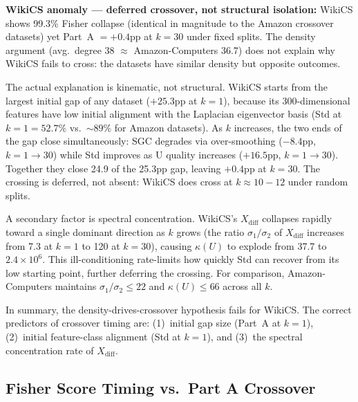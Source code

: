 \documentclass[11pt]{article}
\begin{document}
\noindent\textbf{WikiCS anomaly --- deferred crossover, not structural isolation:}
WikiCS shows 99.3\% Fisher collapse (identical in magnitude to the Amazon crossover
datasets) yet Part~A $= +0.4$pp at $k{=}30$ under fixed splits.
The density argument (avg.\ degree 38 $\approx$ Amazon-Computers 36.7) does not
explain why WikiCS fails to cross: the datasets have similar density but opposite outcomes.

The actual explanation is kinematic, not structural.
WikiCS starts from the largest initial gap of any dataset ($+25.3$pp at $k{=}1$),
because its 300-dimensional features have low initial alignment with the Laplacian
eigenvector basis (Std at $k{=}1 = 52.7\%$ vs.\ ${\sim}89\%$ for Amazon datasets).
As $k$ increases, the two ends of the gap close simultaneously: SGC degrades via
over-smoothing ($-8.4$pp, $k{=}1{\to}30$) while Std improves as U quality increases
($+16.5$pp, $k{=}1{\to}30$).  Together they close 24.9 of the 25.3pp gap, leaving
$+0.4$pp at $k{=}30$.  The crossing is deferred, not absent: WikiCS does cross at
$k{\approx}10{-}12$ under random splits.

A secondary factor is spectral concentration.  WikiCS's $X_{\mathrm{diff}}$ collapses
rapidly toward a single dominant direction as $k$ grows (the ratio
$\sigma_1/\sigma_2$ of $X_{\mathrm{diff}}$ increases from 7.3 at $k{=}1$ to 120 at
$k{=}30$), causing $\kappa(U)$ to explode from 37.7 to $2.4{\times}10^6$.  This
ill-conditioning rate-limits how quickly Std can recover from its low starting point,
further deferring the crossing.  For comparison, Amazon-Computers maintains
$\sigma_1/\sigma_2 \leq 22$ and $\kappa(U) \leq 66$ across all $k$.

In summary, the density-drives-crossover hypothesis fails for WikiCS.
The correct predictors of crossover timing are: (1)~initial gap size (Part~A at $k{=}1$),
(2)~initial feature-class alignment (Std at $k{=}1$), and
(3)~the spectral concentration rate of $X_{\mathrm{diff}}$.

\subsection{Fisher Score Timing vs.\ Part A Crossover}
\end{document}
